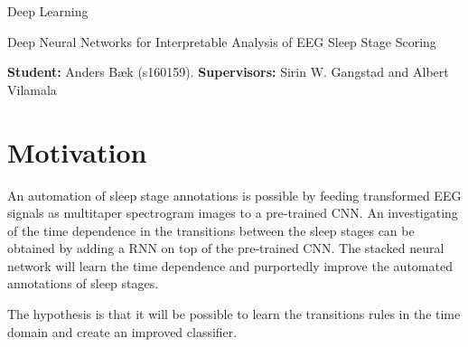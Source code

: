 \documentclass[11pt]{article}
\begin{document}
\begin{center}
{{\Large \sc Deep Learning}} 

{{\large \sc Deep Neural Networks for Interpretable Analysis of EEG Sleep Stage Scoring}}

\textbf{Student:} Anders Bæk (s160159). \textbf{Supervisors:} Sirin W. Gangstad and Albert Vilamala
\end{center}





%





\section*{Motivation}

An automation of sleep stage annotations is possible by feeding transformed EEG signals as multitaper spectrogram images to a pre-trained CNN. An investigating of the time dependence in the transitions between the sleep stages can be obtained by adding a RNN on top of the pre-trained CNN. The stacked neural network will learn the time dependence and purportedly improve the automated annotations of sleep stages.

The hypothesis is that it will be possible to learn the transitions rules in the time domain and create an improved classifier.



%
%
%
\end{document}
